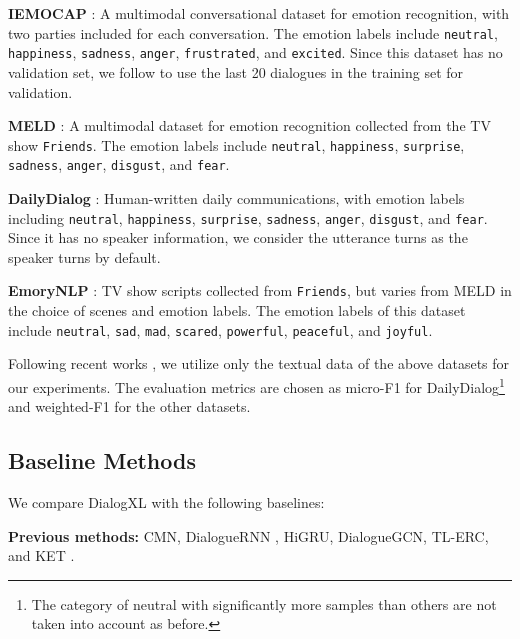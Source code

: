 \documentclass[letterpaper]{article} \usepackage{aaai21}  \usepackage{times}  \usepackage{helvet} \usepackage{courier}  \usepackage[hyphens]{url}  \usepackage{graphicx} \usepackage{amstext}
\begin{document}
\noindent\textbf{IEMOCAP} \cite{busso2008iemocap}: A multimodal  conversational dataset for emotion recognition, with two parties included for each conversation. The emotion labels include \texttt{neutral}, \texttt{happiness}, \texttt{sadness}, \texttt{anger}, \texttt{frustrated}, and \texttt{excited}. Since this dataset has no validation set, we follow \cite{zhong2019knowledge} to use the last 20 dialogues in the training set for validation.

\noindent\textbf{MELD} \cite{poria2019meld}: A multimodal dataset for emotion recognition collected from the TV show \texttt{Friends}. The emotion labels include \texttt{neutral}, \texttt{happiness}, \texttt{surprise}, \texttt{sadness}, \texttt{anger}, \texttt{disgust}, and \texttt{fear}. 

\noindent\textbf{DailyDialog} \cite{li2017dailydialog}: Human-written daily communications, with emotion labels including \texttt{neutral},   \texttt{happiness}, \texttt{surprise}, \texttt{sadness}, \texttt{anger}, \texttt{disgust}, and \texttt{fear}. Since it has no speaker information, we consider the utterance turns as the speaker turns by default.

\noindent\textbf{EmoryNLP} \cite{zahiri2017emotion}: TV show scripts collected from \texttt{Friends}, but varies from MELD in the choice of scenes and emotion labels. The emotion labels of this dataset include \texttt{neutral}, \texttt{sad}, \texttt{mad}, \texttt{scared}, \texttt{powerful}, \texttt{peaceful}, and \texttt{joyful}.

Following recent works \cite{ghosal2019dialoguegcn,zhong2019knowledge,hazarika2019emotion}, we utilize only the textual data of the above datasets for our experiments. The evaluation metrics are chosen as micro-F1 for DailyDialog\footnote{The category of neutral with significantly more samples than others are not taken into account as before.} and weighted-F1 for the other datasets.


\subsection{Baseline Methods}

We compare DialogXL with the following baselines:

\noindent\textbf{Previous methods:} CMN\cite{hazarika2018conversational}, DialogueRNN \cite{majumder2019dialoguernn}, HiGRU\cite{jiao2019higru}, DialogueGCN\cite{ghosal2019dialoguegcn}, TL-ERC\cite{hazarika2019emotion},  
and KET \cite{zhong2019knowledge}. 
\end{document}
